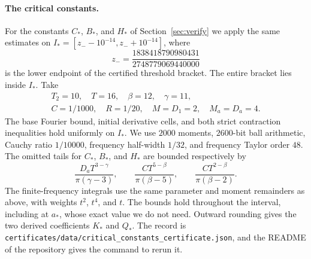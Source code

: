 \paragraph{The critical constants.}
For the constants $C_*$, $B_*$, and $H_*$ of Section~\ref{sec:verify} we apply the same estimates on
$I_*=[z_--10^{-14},z_-+10^{-14}]$, where
\[
 z_-=\frac{1838418790980431}{2748779069440000}
\]
is the lower endpoint of the
certified threshold bracket. The entire bracket lies inside $I_*$.
Take
\[
 \begin{gathered}
 T_2=10,\quad T=16,\quad\beta=12,\quad\gamma=11,\\
 C=1/1000,\quad R=1/20,\quad M=D_1=2,\quad M_a=D_a=4.
 \end{gathered}
\]
The base Fourier bound, initial derivative cells, and both strict
contraction inequalities hold uniformly on $I_*$. We use $2000$ moments,
$2600$-bit ball arithmetic, Cauchy ratio $1/10000$, frequency half-width
$1/32$, and frequency Taylor order $48$.
The omitted tails for $C_*$, $B_*$, and $H_*$ are bounded respectively by
\[
 \frac{D_aT^{3-\gamma}}{\pi(\gamma-3)},\qquad
 \frac{CT^{5-\beta}}{\pi(\beta-5)},\qquad
 \frac{CT^{2-\beta}}{\pi(\beta-2)}.
\]
The finite-frequency integrals use the same parameter and moment
remainders as above, with weights $t^2$, $t^4$, and $t$.
The bounds hold throughout the interval, including at $a_*$,
whose exact value we do not need. Outward rounding gives the
two derived coefficients $K_*$ and $Q_*$. The record is
\texttt{certificates/data/critical\_constants\_certificate.json}, and the README of
the repository gives the command to rerun it.
